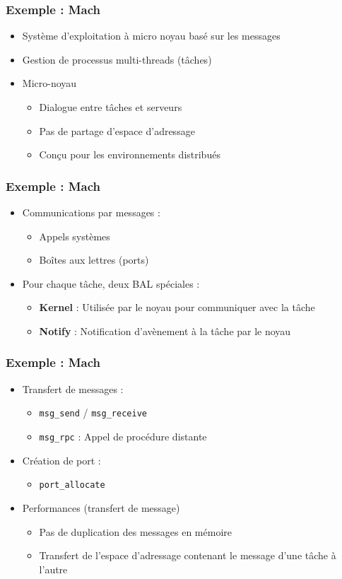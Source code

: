 \begin{frame}
\frametitle{Exemple : Mach}
\begin{itemize}
\item Système d’exploitation à micro noyau basé sur les messages
\item Gestion de processus multi-threads (tâches)
\item Micro-noyau
\begin{itemize}
\item Dialogue entre tâches et serveurs
\item Pas de partage d’espace d’adressage
\item Conçu pour les environnements distribués
\end{itemize}
\end{itemize}
\end{frame}

\begin{frame}
\frametitle{Exemple : Mach}
\begin{itemize}
\item Communications par messages :
\begin{itemize}
\item Appels systèmes
\item Boîtes aux lettres (ports)
\end{itemize}
\item Pour chaque tâche, deux BAL spéciales :
\begin{itemize}
\item \textbf{Kernel} : Utilisée par le noyau pour communiquer avec la tâche
\item \textbf{Notify} : Notification d’avènement à la tâche par le noyau
\end{itemize}
\end{itemize}
\end{frame}

\begin{frame}
\frametitle{Exemple : Mach}
\begin{itemize}
\item Transfert de messages :
\begin{itemize}
\item \texttt{msg\_send} / \texttt{msg\_receive}
\item \texttt{msg\_rpc} : Appel de procédure distante
\end{itemize}
\item Création de port :
\begin{itemize}
\item \texttt{port\_allocate}
\end{itemize}
\item Performances (transfert de message)
\begin{itemize}
\item Pas de duplication des messages en mémoire
\item Transfert de l’espace d’adressage contenant le message d’une tâche à l’autre
\end{itemize}
\end{itemize}
\end{frame}

